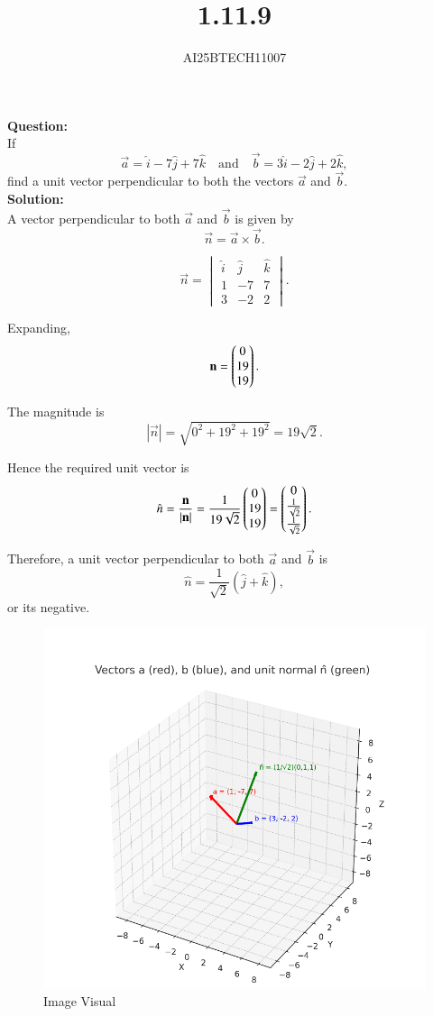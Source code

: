 \documentclass[journal]{IEEEtran}
\begin{document}

\vspace{3cm}

\title{1.11.9}
\author{AI25BTECH11007}
 \maketitle
{\let\newpage\relax\maketitle}

\renewcommand{\thefigure}{\theenumi}
\renewcommand{\thetable}{\theenumi}
\setlength{\intextsep}{10pt} %


\renewcommand{\thetable}{\theenumi}
\noindent
\textbf{Question:}\\
If
\[
\vec{a} = \hat{i} - 7\hat{j} + 7\hat{k}
\quad \text{and} \quad
\vec{b} = 3\hat{i} - 2\hat{j} + 2\hat{k},
\]
find a unit vector perpendicular to both the vectors $\vec{a}$ and $\vec{b}$.\\
\textbf{Solution:}\\
A vector perpendicular to both $\vec{a}$ and $\vec{b}$ is given by
\[
\vec{n} = \vec{a} \times \vec{b}.
\]

\[
\vec{n} =
\begin{vmatrix}
\hat{i} & \hat{j} & \hat{k} \\
1 & -7 & 7 \\
3 & -2 & 2
\end{vmatrix}.
\]

Expanding,
\[
\mathbf{n} = \begin{pmatrix}0 \\ 19 \\ 19\end{pmatrix}.
\]

The magnitude is
\[
|\vec{n}| = \sqrt{0^2 + 19^2 + 19^2} = 19\sqrt{2}.
\]

Hence the required unit vector is
\[
\hat{n} = \frac{\mathbf{n}}{|\mathbf{n}|}
= \frac{1}{19\sqrt{2}} \begin{pmatrix}0 \\ 19 \\ 19\end{pmatrix}
= \begin{pmatrix}0 \\ \tfrac{1}{\sqrt{2}} \\ \tfrac{1}{\sqrt{2}}\end{pmatrix}.
\]

Therefore, a unit vector perpendicular to both $\vec{a}$ and $\vec{b}$ is
\[
\hat{n} = \frac{1}{\sqrt{2}}(\hat{j} + \hat{k}),
\]
or its negative.

\begin{figure}[H]
    \centering
    \includegraphics[width=0.75\columnwidth]{figs/image.png}
    \caption{Image Visual}
    \label{fig:figs/image.png}
\end{figure}
  
\end{document}
